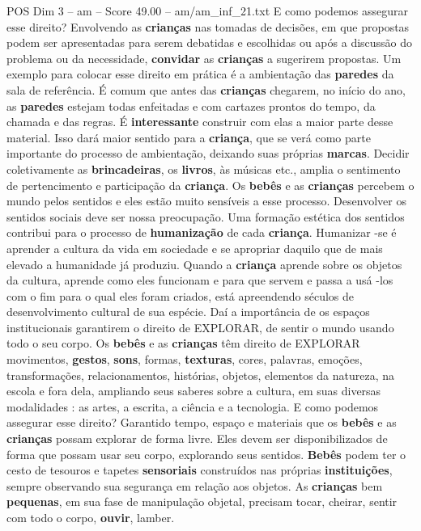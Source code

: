 \begin{textsample}{POS Dim 3 – am – Score 49.00 – am/am\_inf\_21.txt}
E como podemos assegurar esse direito?
Envolvendo as \textbf{crianças} nas tomadas de decisões, em que propostas podem ser apresentadas para serem debatidas e escolhidas ou após a discussão do problema ou da necessidade, \textbf{convidar} as \textbf{crianças} a sugerirem propostas.
Um exemplo para colocar esse direito em prática é a ambientação das \textbf{paredes} da sala de referência.
É comum que antes das \textbf{crianças} chegarem, no início do ano, as \textbf{paredes} estejam todas enfeitadas e com cartazes prontos do tempo, da chamada e das regras.
É \textbf{interessante} construir com elas a maior parte desse material.
Isso dará maior sentido para a \textbf{criança}, que se verá como parte importante do processo de ambientação, deixando suas próprias \textbf{marcas}.
Decidir coletivamente as \textbf{brincadeiras}, os \textbf{livros}, às músicas etc., amplia o sentimento de pertencimento e participação da \textbf{criança}.
Os \textbf{bebês} e as \textbf{crianças} percebem o mundo pelos sentidos e eles estão muito sensíveis a esse processo.
Desenvolver os sentidos sociais deve ser nossa preocupação.
Uma formação estética dos sentidos contribui para o processo de \textbf{humanização} de cada \textbf{criança}.
Humanizar -se é aprender a cultura da vida em sociedade e se apropriar daquilo que de mais elevado a humanidade já produziu.
Quando a \textbf{criança} aprende sobre os objetos da cultura, aprende como eles funcionam e para que servem e passa a usá -los com o fim para o qual eles foram criados, está apreendendo séculos de desenvolvimento cultural de sua espécie.
Daí a importância de os espaços institucionais garantirem o direito de EXPLORAR, de sentir o mundo usando todo o seu corpo.
Os \textbf{bebês} e as \textbf{crianças} têm direito de EXPLORAR movimentos, \textbf{gestos}, \textbf{sons}, formas, \textbf{texturas}, cores, palavras, emoções, transformações, relacionamentos, histórias, objetos, elementos da natureza, na escola e fora dela, ampliando seus saberes sobre a cultura, em suas diversas modalidades : as artes, a escrita, a ciência e a tecnologia.
E como podemos assegurar esse direito?
Garantido tempo, espaço e materiais que os \textbf{bebês} e as \textbf{crianças} possam explorar de forma livre.
Eles devem ser disponibilizados de forma que possam usar seu corpo, explorando seus sentidos. \textbf{Bebês} podem ter o cesto de tesouros e tapetes \textbf{sensoriais} construídos nas próprias \textbf{instituições}, sempre observando sua segurança em relação aos objetos.
As \textbf{crianças} bem \textbf{pequenas}, em sua fase de manipulação objetal, precisam tocar, cheirar, sentir com todo o corpo, \textbf{ouvir}, lamber.

\end{textsample}
